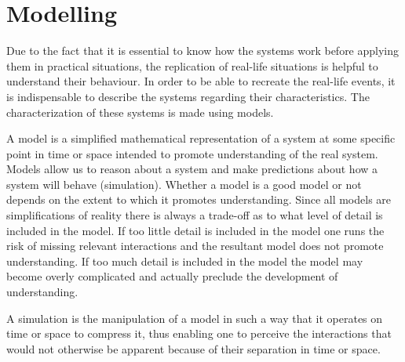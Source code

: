 \chapter{Modelling}\label{ch:model}

Due to the fact that it is essential to know how the systems work before applying them in practical situations, the replication of real-life situations is helpful to understand their behaviour. In order to be able to recreate the real-life events, it is indispensable to describe the systems regarding their characteristics. The characterization of these systems is made using models.  

A model is a simplified mathematical representation of a system at some specific point in time or space intended to promote understanding of the real system. Models allow us to reason about a system and make predictions about how a system will behave (simulation). Whether a model is a good model or not depends on the extent to which it promotes understanding. Since all models are simplifications of reality there is always a trade-off as to what level of detail is included in the model. If too little detail is included in the model one runs the risk of missing relevant interactions and the resultant model does not promote understanding. If too much detail is included in the model the model may become overly complicated and actually preclude the development of understanding. 

A simulation is the manipulation of a model in such a way that it operates on time or space to compress it, thus enabling one to perceive the interactions that would not otherwise be apparent because of their separation in time or space.